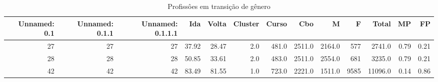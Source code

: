 \begin{table}
\centering
\caption{Profissôes em transição de gênero}
\label{tab:Salarios_Desequlibrio_F}
\begin{tabular}{rrrrrrrrrrrrr}
\toprule
 Unnamed: 0.1 &  Unnamed: 0.1.1 &  Unnamed: 0.1.1.1 &   Ida &  Volta &  Cluster &  Curso &    Cbo &      M &    F &   Total &   MP &   FP \\
\midrule
           27 &              27 &                27 & 37.92 &  28.47 &      2.0 &  481.0 & 2511.0 & 2164.0 &  577 &  2741.0 & 0.79 & 0.21 \\
           28 &              28 &                28 & 50.85 &  33.61 &      2.0 &  483.0 & 2511.0 & 2554.0 &  681 &  3235.0 & 0.79 & 0.21 \\
           42 &              42 &                42 & 83.49 &  81.55 &      1.0 &  723.0 & 2221.0 & 1511.0 & 9585 & 11096.0 & 0.14 & 0.86 \\
\bottomrule
\end{tabular}
\end{table}
